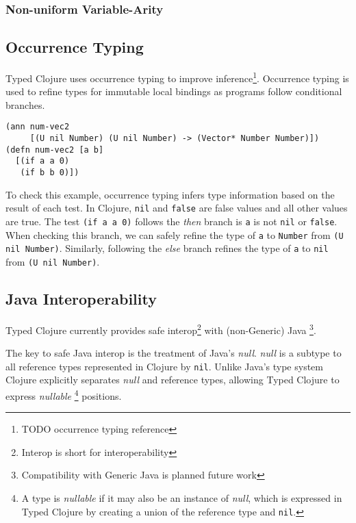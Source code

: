 \subsubsection{Non-uniform Variable-Arity}

\subsection{Occurrence Typing}

Typed Clojure uses occurrence typing to improve inference\footnote{TODO occurrence typing reference}.
Occurrence typing is used to refine types for immutable local bindings 
as programs follow conditional branches.

\begin{lstlisting}
(ann num-vec2 
     [(U nil Number) (U nil Number) -> (Vector* Number Number)])
(defn num-vec2 [a b]
  [(if a a 0) 
   (if b b 0)])
\end{lstlisting}

To check this example, occurrence typing infers type information based on the result of each test.
In Clojure, \lstinline|nil| and \lstinline|false| are false values and all other values are true.
The test \lstinline|(if a a 0)| follows the \emph{then} branch is \lstinline|a| is not \lstinline|nil|
or \lstinline|false|. When checking this branch, we can safely refine the type of \lstinline|a| to \lstinline|Number| from
\lstinline|(U nil Number)|. Similarly, following the \emph{else} branch refines the type of \lstinline|a|
to \lstinline|nil| from \lstinline|(U nil Number)|.

\subsection{Java Interoperability}

Typed Clojure currently provides safe interop\footnote{Interop is short for interoperability} with (non-Generic) Java
\footnote{Compatibility with Generic Java is planned future work}.

The key to safe Java interop is the treatment of Java's \emph{null}.
\emph{null} is a subtype to all reference types
represented in Clojure by \lstinline|nil|. Unlike Java's type system
Clojure explicitly separates \emph{null} and reference types, allowing
Typed Clojure to express
\emph{nullable}
\footnote{A type is \emph{nullable} if it may also be an instance of \emph{null},
which is expressed in Typed Clojure by creating a union of the reference type and \lstinline|nil|.}
positions.


